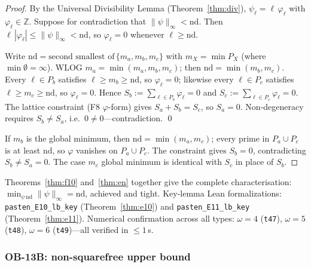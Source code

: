 \documentclass[12pt]{article}
\theoremstyle{definition}
\begin{document}
\begin{proof}
By the Universal Divisibility Lemma (Theorem~\ref{thm:div}),
$\psi_\ell=\ell\,\varphi_\ell$ with $\varphi_\ell\in\mathbb{Z}$.
Suppose for contradiction that $\|\psi\|_\infty < \mathrm{nd}$.
Then $\ell\,|\varphi_\ell|\le\|\psi\|_\infty<\mathrm{nd}$, so $\varphi_\ell=0$
whenever $\ell\ge\mathrm{nd}$.

Write $\mathrm{nd}=\text{second smallest of}\,\{m_a,m_b,m_c\}$ with $m_X=\min P_X$
(where $\min\emptyset=\infty$).  WLOG $m_a=\min(m_a,m_b,m_c)$; then
$\mathrm{nd}=\min(m_b,m_c)$.
Every $\ell\in P_b$ satisfies $\ell\ge m_b\ge\mathrm{nd}$, so $\varphi_\ell=0$;
likewise every $\ell\in P_c$ satisfies $\ell\ge m_c\ge\mathrm{nd}$, so $\varphi_\ell=0$.
Hence $S_b:=\sum_{\ell\in P_b}\varphi_\ell=0$ and $S_c:=\sum_{\ell\in P_c}\varphi_\ell=0$.
The lattice constraint (F8 $\varphi$-form) gives $S_a+S_b=S_c$, so $S_a=0$.
Non-degeneracy requires $S_b\ne S_a$, i.e.\ $0\ne 0$---contradiction. \qed

If $m_b$ is the global minimum, then $\mathrm{nd}=\min(m_a,m_c)$; every prime in
$P_a\cup P_c$ is at least $\mathrm{nd}$, so $\varphi$ vanishes on $P_a\cup P_c$.
The constraint gives $S_b=0$, contradicting $S_b\ne S_a=0$.  The case $m_c$
global minimum is identical with $S_c$ in place of $S_b$.
\end{proof}

Theorems~\ref{thm:f10} and~\ref{thm:en} together give the complete characterisation:
$\min_{\psi\,\mathrm{nd}}\|\psi\|_\infty = \mathrm{nd}$, achieved and tight.
Key-lemma Lean formalizations: \texttt{pasten\_E10\_lb\_key} (Theorem~\ref{thm:e10}) and
\texttt{pasten\_E11\_lb\_key} (Theorem~\ref{thm:e11}).
Numerical confirmation across all types: $\omega=4$ (\texttt{t47}),
$\omega=5$ (\texttt{t48}), $\omega=6$ (\texttt{t49})---all verified in $\le 1$\,s.

\subsubsection*{OB-13B: non-squarefree upper bound}
\end{document}
